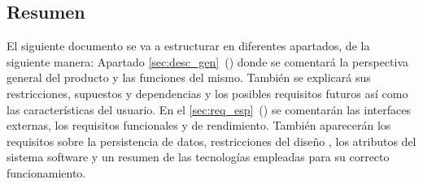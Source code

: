 \subsection{Resumen}
El siguiente documento se va a estructurar en diferentes apartados, de la siguiente manera: Apartado \ref{sec:desc_gen}~() donde se comentará la perspectiva general del producto y las funciones del mismo. También se explicará sus restricciones, supuestos y dependencias y los posibles requisitos futuros así como las características del usuario.
En el \ref{sec:req_esp}~() se comentarán las interfaces externas, los requisitos funcionales y de rendimiento. También aparecerán los requisitos sobre la persistencia de datos, restricciones del diseño , los atributos del sistema software y un resumen de las tecnologías empleadas para su correcto funcionamiento.
